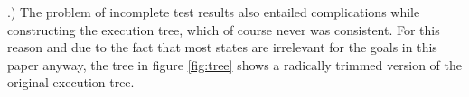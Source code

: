 .) The problem of incomplete test results also entailed complications while constructing the execution tree, which of course never was consistent.
For this reason and due to the fact that most states are irrelevant for the goals in this paper anyway, the tree in figure \ref{fig:tree} shows a radically trimmed version of the original execution tree.








\iffalse
§6	Interpretation of S2E analysis output
		> Execution Traces
		> Gefundene Privacy-Probleme
		> Eventuell nicht gefundene Sachen
		> Probleme bei der Analyse
\fi